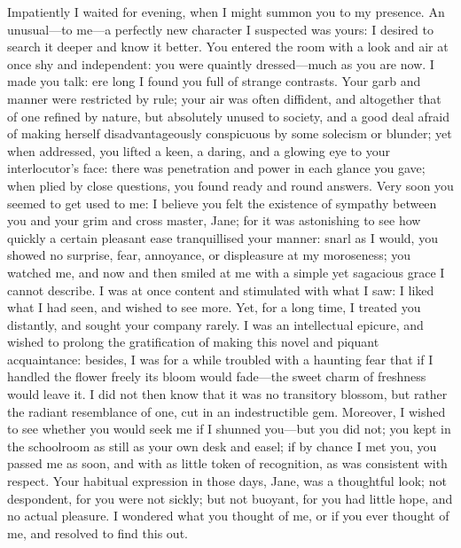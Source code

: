 {	%
	Impatiently I waited for evening, when I might summon you to my
	presence. An unusual---to me---a perfectly new character I suspected
	was yours: I desired to search it deeper and know it better. You
	entered the room with a look and air at once shy and independent: you
	were quaintly dressed---much as you are now. I made you talk: ere long
	I found you full of strange contrasts. Your garb and manner were
	restricted by rule; your air was often diffident, and altogether that of
	one refined by nature, but absolutely unused to society, and a good deal
	afraid of making herself disadvantageously conspicuous by some solecism
	or blunder; yet when addressed, you lifted a keen, a daring, and a
	glowing eye to your interlocutor's face: there was penetration and power
	in each glance you gave; when plied by close questions, you found ready
	and round answers. Very soon you seemed to get used to me: I believe
	you felt the existence of sympathy between you and your grim and cross
	master, Jane; for it was astonishing to see how quickly a certain
	pleasant ease tranquillised your manner: snarl as I would, you showed no
	surprise, fear, annoyance, or displeasure at my moroseness; you watched
	me, and now and then smiled at me with a simple yet sagacious grace I
	cannot describe. I was at once content and stimulated with what I saw:
	I liked what I had seen, and wished to see more. Yet, for a long time,
	I treated you distantly, and sought your company rarely. I was an
	intellectual epicure, and wished to prolong the gratification of making
	this novel and piquant acquaintance: besides, I was for a while troubled
	with a haunting fear that if I handled the flower freely its bloom would
	fade---the sweet charm of freshness would leave it. I did not then know
	that it was no transitory blossom, but rather the radiant resemblance of
	one, cut in an indestructible gem. Moreover, I wished to see whether
	you would seek me if I shunned you---but you did not; you kept in the
	schoolroom as still as your own desk and easel; if by chance I met you,
	you passed me as soon, and with as little token of recognition, as was
	consistent with respect. Your habitual expression in those days, Jane,
	was a thoughtful look; not despondent, for you were not sickly; but not
	buoyant, for you had little hope, and no actual pleasure. I wondered
	what you thought of me, or if you ever thought of me, and resolved to
	find this out.

}
